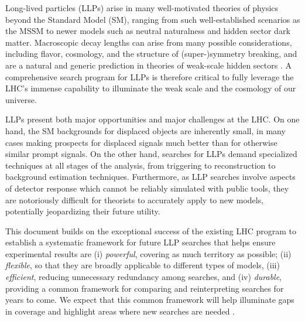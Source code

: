 


Long-lived particles (LLPs) arise in many well-motivated theories of physics beyond the Standard Model (SM), ranging from such well-established scenarios as the MSSM to newer models such as neutral naturalness and hidden sector dark matter.  Macroscopic decay lengths can arise from many possible considerations, including flavor, cosmology, and the structure of (super-)symmetry breaking, and are a natural and generic prediction in theories of weak-scale hidden sectors \cite{Chen:1995yu,Thomas:1998wy,Feng:1999fu,Strassler:2006im,Strassler:2006ri}.  A comprehensive search program for LLPs is therefore critical to fully leverage the LHC's immense capability to illuminate the weak scale and the cosmology of our universe. 

LLPs present both major opportunities and major challenges at the LHC.  On one hand, the SM backgrounds for displaced objects are inherently small, in many cases making prospects for displaced signals much better than for otherwise similar prompt signals.  On the other hand, searches for LLPs demand specialized techniques at all stages of the analysis, from triggering to reconstruction to background estimation techniques.  Furthermore, as LLP searches involve aspects of detector response which cannot be reliably simulated with public tools, they are notoriously difficult for theorists to accurately apply to new models, potentially jeopardizing their future utility.  

This document builds on the exceptional success of the existing LHC program to establish a systematic framework for future LLP searches that helps ensure experimental results are (i) {\em powerful}, covering as much territory as possible; (ii) {\em flexible}, so that they are broadly applicable to different types of models, (iii) {\em efficient}, reducing unnecessary redundancy among searches, and (iv) {\em durable}, providing a common framework for comparing and reinterpreting searches for years to come.
We expect that this common framework will help illuminate gaps in coverage and highlight areas where new searches are needed \cite{LHC-LLP}.





